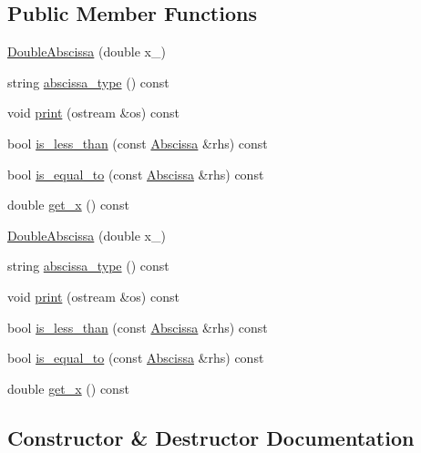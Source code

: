 \subsection*{Public Member Functions}
\begin{DoxyCompactItemize}
\item 
\mbox{\hyperlink{classDoubleAbscissa_a5016607adef916326df008884eb3ed07}{Double\+Abscissa}} (double x\+\_\+)
\item 
string \mbox{\hyperlink{classDoubleAbscissa_ae69cb78334800cb8477daf2cefb4d67e}{abscissa\+\_\+type}} () const
\item 
void \mbox{\hyperlink{classDoubleAbscissa_a164c2a9d56e6c9454069c70d6593a39b}{print}} (ostream \&os) const
\item 
bool \mbox{\hyperlink{classDoubleAbscissa_acf3a2bfc6b2c43a7a84310943b81849d}{is\+\_\+less\+\_\+than}} (const \mbox{\hyperlink{classAbscissa}{Abscissa}} \&rhs) const
\item 
bool \mbox{\hyperlink{classDoubleAbscissa_ac62533c5fa000e272ad818c0afe7f02b}{is\+\_\+equal\+\_\+to}} (const \mbox{\hyperlink{classAbscissa}{Abscissa}} \&rhs) const
\item 
double \mbox{\hyperlink{classDoubleAbscissa_a9ed0def501b85ac1b9062d5a0dee9895}{get\+\_\+x}} () const
\item 
\mbox{\hyperlink{classDoubleAbscissa_a5016607adef916326df008884eb3ed07}{Double\+Abscissa}} (double x\+\_\+)
\item 
string \mbox{\hyperlink{classDoubleAbscissa_ae69cb78334800cb8477daf2cefb4d67e}{abscissa\+\_\+type}} () const
\item 
void \mbox{\hyperlink{classDoubleAbscissa_a164c2a9d56e6c9454069c70d6593a39b}{print}} (ostream \&os) const
\item 
bool \mbox{\hyperlink{classDoubleAbscissa_acf3a2bfc6b2c43a7a84310943b81849d}{is\+\_\+less\+\_\+than}} (const \mbox{\hyperlink{classAbscissa}{Abscissa}} \&rhs) const
\item 
bool \mbox{\hyperlink{classDoubleAbscissa_ac62533c5fa000e272ad818c0afe7f02b}{is\+\_\+equal\+\_\+to}} (const \mbox{\hyperlink{classAbscissa}{Abscissa}} \&rhs) const
\item 
double \mbox{\hyperlink{classDoubleAbscissa_a9ed0def501b85ac1b9062d5a0dee9895}{get\+\_\+x}} () const
\end{DoxyCompactItemize}


\subsection{Constructor \& Destructor Documentation}
\mbox{\label{classDoubleAbscissa_a5016607adef916326df008884eb3ed07}} 
